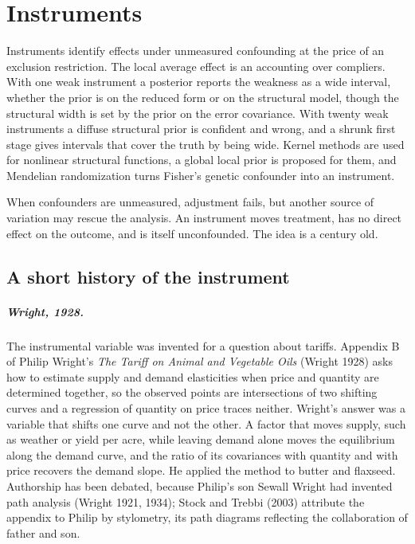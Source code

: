 \chapter{Instruments}\label{ch:iv}


\begin{tcolorbox}[colback=gray!6,colframe=gray!50,title=In brief,fonttitle=\normalfont\itshape,coltitle=black,colbacktitle=gray!15,boxrule=0.4pt,arc=1pt]
Instruments identify effects under unmeasured confounding at the price of an exclusion restriction. The local average effect is an accounting over compliers. With one weak instrument a posterior reports the weakness as a wide interval, whether the prior is on the reduced form or on the structural model, though the structural width is set by the prior on the error covariance. With twenty weak instruments a diffuse structural prior is confident and wrong, and a shrunk first stage gives intervals that cover the truth by being wide. Kernel methods are used for nonlinear structural functions, a global local prior is proposed for them, and Mendelian randomization turns Fisher's genetic confounder into an instrument.
\end{tcolorbox}

When confounders are unmeasured, adjustment fails, but another source of variation may rescue the analysis. An instrument moves treatment, has no direct effect on the outcome, and is itself unconfounded. The idea is a century old.

\section{A short history of the instrument}\label{iv:sec:history}

\paragraph{Wright, 1928.} The instrumental variable was invented for a question about tariffs. Appendix B of Philip Wright's \emph{The Tariff on Animal and Vegetable Oils} (Wright 1928) asks how to estimate supply and demand elasticities when price and quantity are determined together, so the observed points are intersections of two shifting curves and a regression of quantity on price traces neither. Wright's answer was a variable that shifts one curve and not the other. A factor that moves supply, such as weather or yield per acre, while leaving demand alone moves the equilibrium along the demand curve, and the ratio of its covariances with quantity and with price recovers the demand slope. He applied the method to butter and flaxseed. Authorship has been debated, because Philip's son Sewall Wright had invented path analysis (Wright 1921, 1934); Stock and Trebbi (2003) attribute the appendix to Philip by stylometry, its path diagrams reflecting the collaboration of father and son.

